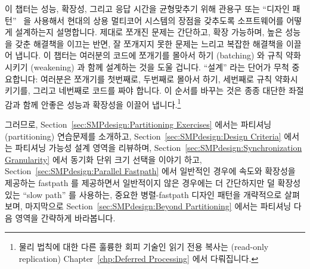 
%

이 챕터는 성능, 확장성, 그리고 응답 시간을 균형맞추기 위해 관용구 또는 ``디자인
패턴''~\cite{Alexander79,GOF95,SchmidtStalRohnertBuschmann2000v2Textbook} 을
사용해서 현대의 상용 멀티코어 시스템의 장점을 갖추도록 소프트웨어를 어떻게
설계하는지 설명합니다.
제대로 쪼개진 문제는 간단하고, 확장 가능하며, 높은 성능을 갖춘 해결책을 이끄는
반면, 잘 쪼개지지 못한 문제는 느리고 복잡한 해결책을 이끌어 냅니다.
이 챕터는 여러분의 코드에 쪼개기를 몰아서 하기 (batching) 와 규칙 약화시키기
(weakening) 과 함께 설계하는 것을 도울 겁니다.
``설계'' 라는 단어가 무척 중요합니다: 여러분은 쪼개기를 첫번째로, 두번째로
몰아서 하기, 세번째로 규칙 약화시키기를, 그리고 네번째로 코드를 짜야 합니다.
이 순서를 바꾸는 것은 종종 대단한 좌절감과 함께 안좋은 성능과 확장성을 이끌어
냅니다.\footnote{
	물리 법칙에 대한 다른 훌륭한 회피 기술인 읽기 전용 복사는 (read-only
	replication)
	Chapter~\ref{chp:Deferred Processing} 에서 다뤄집니다.}

그러므로, Section~\ref{sec:SMPdesign:Partitioning Exercises} 에서는 파티셔닝
(partitioning) 연습문제를 소개하고,
Section~\ref{sec:SMPdesign:Design Criteria} 에서는 파티셔닝 가능성 설계 영역을
리뷰하며,
Section~\ref{sec:SMPdesign:Synchronization Granularity}
에서 동기화 단위 크기 선택을 이야기 하고,
Section~\ref{sec:SMPdesign:Parallel Fastpath}
에서 일반적인 경우에 속도와 확장성을 제공하는 fastpath 를 제공하면서 일반적이지
않은 경우에는 더 간단하지만 덜 확장성 있는 ``slow path'' 를 사용하는, 중요한
병렬-fastpath 디자인 패턴을 개략적으로 살펴보며, 마지막으로
Section~\ref{sec:SMPdesign:Beyond Partitioning}
에서는 파티셔닝 다음 영역을 간략하게 바라봅니다.

